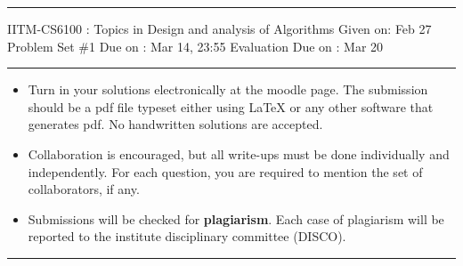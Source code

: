 \documentclass[solution,addpoints,12pt]{exam}
\begin{document}
\hrule
\vspace{3mm}
\noindent 
{\sf IITM-CS6100 : Topics in Design and analysis of Algorithms  \hfill Given on: Feb 27}
\vspace{3mm}\\
\noindent 
{\sf Problem Set \#1 \hfill Due on : Mar 14, 23:55}
{\hfill \sf Evaluation Due on : Mar 20 }
\vspace{3mm}
\hrule
{\small
\begin{itemize}
\item Turn in your solutions electronically at the moodle page. The submission should be a pdf file typeset either using     LaTeX or any other software that generates pdf. No handwritten solutions are accepted. 
\item Collaboration is encouraged, but all write-ups must be done
  individually and independently. For each question, you are required to mention the set of collaborators, if any.  
 \item Submissions will be checked for {\bf plagiarism}. Each case of plagiarism will be reported to the institute disciplinary committee (DISCO). 
\end{itemize}}
\hrule
\vspace{3mm}
\end{document}
